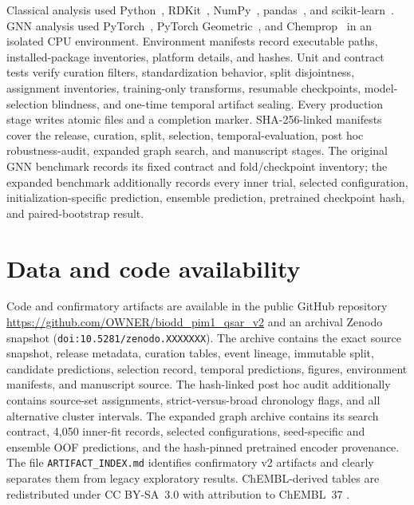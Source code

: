 \documentclass[11pt]{article}
\begin{document}
Classical analysis used Python~\ClassicalPythonVersion{}, RDKit~\RDKitVersion{},
NumPy~\NumPyVersion{}, pandas~\PandasVersion{}, and scikit-learn~\SklearnVersion{}.
GNN analysis used PyTorch~\TorchVersion{}, PyTorch Geometric~\PyGVersion{}, and
Chemprop~\ChempropVersion{} in an isolated CPU environment. Environment manifests
record executable paths, installed-package inventories, platform details, and
hashes. Unit and contract tests verify curation filters, standardization behavior,
split disjointness, assignment inventories, training-only transforms, resumable
checkpoints, model-selection blindness, and one-time temporal artifact sealing.
Every production stage writes atomic files and a completion marker. SHA-256-linked
manifests cover the release, curation, split, selection, temporal-evaluation,
post hoc robustness-audit, expanded graph search, and manuscript stages. The
original GNN benchmark records its fixed contract and fold/checkpoint inventory;
the expanded benchmark additionally records every inner trial, selected
configuration, initialization-specific prediction, ensemble prediction,
pretrained checkpoint hash, and paired-bootstrap result.

\section{Data and code availability}

Code and confirmatory artifacts are available in the public GitHub repository
\url{https://github.com/OWNER/biodd_pim1_qsar_v2}
and an archival Zenodo snapshot (\texttt{doi:10.5281/zenodo.XXXXXXX}).
The archive contains the exact source snapshot, release metadata, curation
tables, event lineage, immutable split, candidate predictions, selection record,
temporal predictions, figures, environment manifests, and manuscript source. The
hash-linked post hoc audit additionally contains source-set assignments,
strict-versus-broad chronology flags, and all alternative cluster intervals. The
expanded graph archive contains its search contract, 4,050 inner-fit records,
selected configurations, seed-specific and ensemble OOF predictions, and the
hash-pinned pretrained encoder provenance. The
file \texttt{ARTIFACT\_INDEX.md} identifies confirmatory v2 artifacts and clearly
separates them from legacy exploratory results. ChEMBL-derived tables are
redistributed under {CC BY-SA}~3.0 with attribution to ChEMBL~37
\citep{zdrazil2024chembl}.
\end{document}
